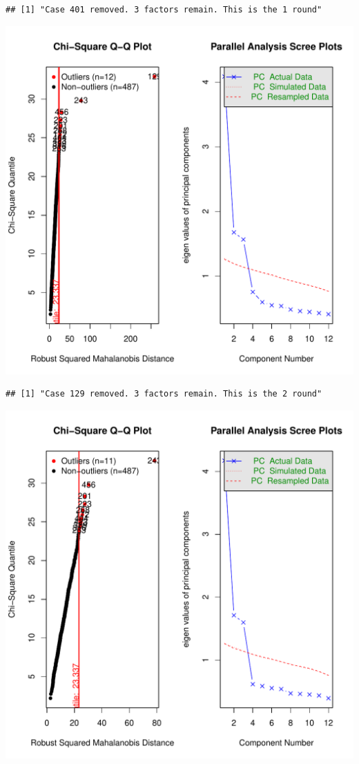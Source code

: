 \documentclass{article}\usepackage[]{graphicx}\usepackage[]{color}
\makeatletter
\def\maxwidth{ %
  \ifdim\Gin@nat@width>\linewidth
    \linewidth
  \else
    \Gin@nat@width
  \fi
}
\newenvironment{kframe}{%
 \def\at@end@of@kframe{}%
 \ifinner\ifhmode%
  \def\at@end@of@kframe{\end{minipage}}%
  \begin{minipage}{\columnwidth}%
 \fi\fi%
 \def\FrameCommand##1{\hskip\@totalleftmargin \hskip-\fboxsep
 \colorbox{shadecolor}{##1}\hskip-\fboxsep
     \hskip-\linewidth \hskip-\@totalleftmargin \hskip\columnwidth}%
 \MakeFramed {\advance\hsize-\width
   \@totalleftmargin\z@ \linewidth\hsize
   \@setminipage}}%
 {\par\unskip\endMakeFramed%
 \at@end@of@kframe}
\newenvironment{knitrout}{}{} %
\makeatother
\begin{document}
\begin{knitrout}
\begin{kframe}\begin{verbatim}
## [1] "Case 401 removed. 3 factors remain. This is the 1 round"
\end{verbatim}
\end{kframe}
\includegraphics[width=\maxwidth]{figure/unnamed-chunk-10-2} 
\begin{kframe}\begin{verbatim}
## [1] "Case 129 removed. 3 factors remain. This is the 2 round"
\end{verbatim}
\end{kframe}
\includegraphics[width=\maxwidth]{figure/unnamed-chunk-10-3} 

\end{knitrout}
\end{document}
